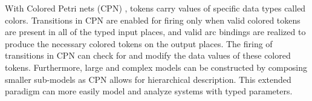 With Colored Petri nets (CPN) \cite{CPN}, tokens carry values of specific data types called colors. Transitions in CPN are enabled for firing only when valid colored tokens are present in all of the typed input places, and valid arc bindings are realized to produce the necessary colored tokens on the output places. The firing of transitions in CPN can check for and modify the data values of these colored tokens. Furthermore, large and complex models can be constructed by composing smaller sub-models as CPN allows for hierarchical description. This extended paradigm can more easily model and analyze systems with typed parameters. 
